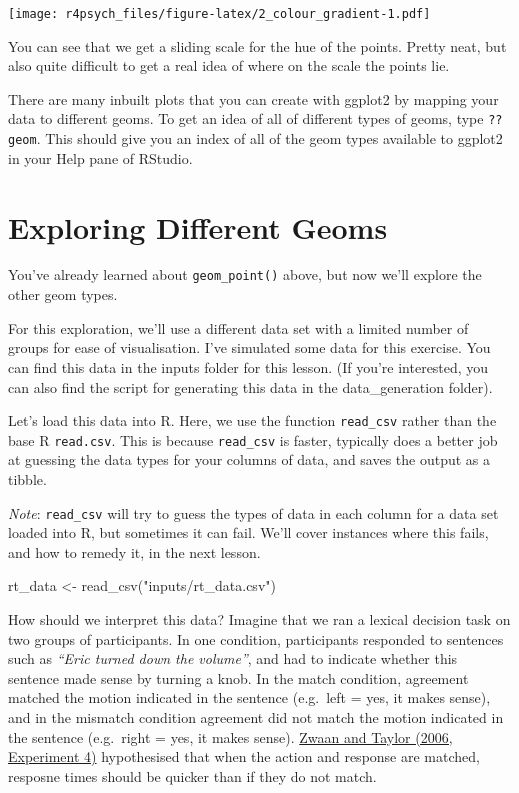 \documentclass[
]{book}
\newenvironment{Shaded}{\begin{snugshade}}{\end{snugshade}}
\newcommand{\FunctionTok}[1]{\textcolor[rgb]{0.00,0.00,0.00}{#1}}
\newcommand{\NormalTok}[1]{#1}
\newcommand{\OtherTok}[1]{\textcolor[rgb]{0.56,0.35,0.01}{#1}}
\newcommand{\StringTok}[1]{\textcolor[rgb]{0.31,0.60,0.02}{#1}}
\begin{document}
\texttt{[image: r4psych\_files/figure-latex/2\_colour\_gradient-1.pdf]}

You can see that we get a sliding scale for the hue of the points. Pretty neat, but also quite difficult to get a real idea of where on the scale the points lie.

There are many inbuilt plots that you can create with ggplot2 by mapping your data to different geoms. To get an idea of all of different types of geoms, type \texttt{??geom}. This should give you an index of all of the geom types available to ggplot2 in your Help pane of RStudio.

\hypertarget{exploring-different-geoms}{%
\section{Exploring Different Geoms}\label{exploring-different-geoms}}

You've already learned about \texttt{geom\_point()} above, but now we'll explore the other geom types.

For this exploration, we'll use a different data set with a limited number of groups for ease of visualisation. I've simulated some data for this exercise. You can find this data in the inputs folder for this lesson. (If you're interested, you can also find the script for generating this data in the data\_generation folder).

Let's load this data into R. Here, we use the function \texttt{read\_csv} rather than the base R \texttt{read.csv}. This is because \texttt{read\_csv} is faster, typically does a better job at guessing the data types for your columns of data, and saves the output as a tibble.

\emph{Note}: \texttt{read\_csv} will try to guess the types of data in each column for a data set loaded into R, but sometimes it can fail. We'll cover instances where this fails, and how to remedy it, in the next lesson.

\begin{Shaded}
\begin{Highlighting}[]
\NormalTok{rt\_data }\OtherTok{\textless{}{-}} \FunctionTok{read\_csv}\NormalTok{(}\StringTok{"inputs/rt\_data.csv"}\NormalTok{)}
\end{Highlighting}
\end{Shaded}

How should we interpret this data? Imagine that we ran a lexical decision task on two groups of participants. In one condition, participants responded to sentences such as \emph{``Eric turned down the volume''}, and had to indicate whether this sentence made sense by turning a knob. In the match condition, agreement matched the motion indicated in the sentence (e.g.~left = yes, it makes sense), and in the mismatch condition agreement did not match the motion indicated in the sentence (e.g.~right = yes, it makes sense). \href{http://psycnet.apa.org/record/2006-01956-001}{Zwaan and Taylor (2006, Experiment 4)} hypothesised that when the action and response are matched, resposne times should be quicker than if they do not match.
\end{document}
